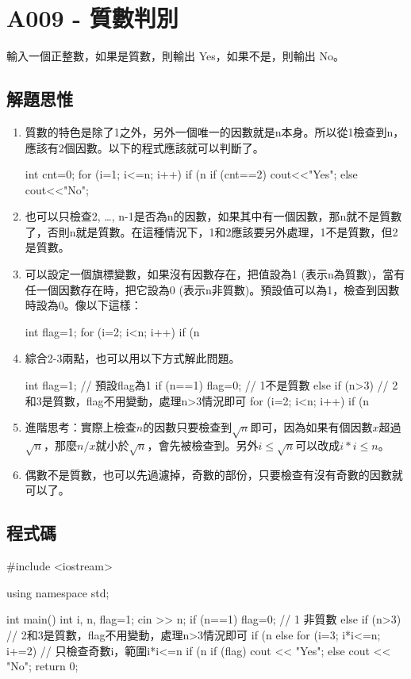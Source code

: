\section{A009 - 質數判別}
輸入一個正整數，如果是質數，則輸出 Yes，如果不是，則輸出 No。

\subsection{解題思惟}
\begin{enumerate}
\item 質數的特色是除了1之外，另外一個唯一的因數就是n本身。所以從1檢查到n，應該有2個因數。以下的程式應該就可以判斷了。
	\begin{inside}
	int cnt=0;
	for (i=1; i<=n; i++) if (n%
	if (cnt==2) cout<<"Yes"; else cout<<"No";
	\end{inside}
\item 也可以只檢查2, …, n-1是否為n的因數，如果其中有一個因數，那n就不是質數了，否則n就是質數。在這種情況下，1和2應該要另外處理，1不是質數，但2是質數。
\item 可以設定一個旗標變數，如果沒有因數存在，把值設為1 (表示n為質數)，當有任一個因數存在時，把它設為0 (表示n非質數)。預設值可以為1，檢查到因數時設為0。像以下這樣：
	\begin{inside}
	int flag=1;
	for (i=2; i<n; i++) if (n%
	\end{inside}
\item 綜合2-3兩點，也可以用以下方式解此問題。
	\begin{inside}
	int flag=1; // 預設flag為1
	if (n==1) flag=0; // 1不是質數
	else if (n>3) { // 2和3是質數，flag不用變動，處理n>3情況即可
		for (i=2; i<n; i++) if (n%
	}
	\end{inside}
\item  進階思考：實際上檢查$n$的因數只要檢查到$\sqrt{n}$即可，因為如果有個因數$x$超過$\sqrt{n}$，那麼$n/x$就小於$\sqrt{n}$，會先被檢查到。另外$i\le\sqrt{n}$可以改成$i*i\le n$。
\item 偶數不是質數，也可以先過濾掉，奇數的部份，只要檢查有沒有奇數的因數就可以了。
\end{enumerate}

\subsection{程式碼}
\begin{cppcode}
	#include <iostream>
	
	using namespace std;
	
	int main()
	{
		int i, n, flag=1;
		cin >> n;
		if (n==1) flag=0; // 1 非質數
		else if (n>3) { // 2和3是質數，flag不用變動，處理n>3情況即可
			if (n%
			else for (i=3; i*i<=n; i+=2) { // 只檢查奇數i，範圍i*i<=n
				if (n%
			}
		}
		if (flag) cout << "Yes";
		else cout << "No";
		return 0;
	}
\end{cppcode}
